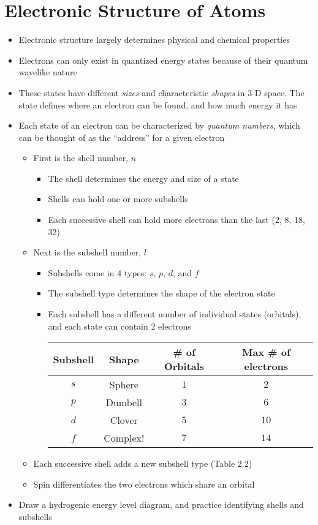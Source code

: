 \documentclass[12pt, openany, letterpaper]{memoir}
\begin{document}
\section{Electronic Structure of Atoms}
\begin{itemize}
	\item Electronic structure largely determines physical and chemical properties
	\item Electrons can only exist in quantized energy states because of their quantum wavelike nature
	\item These states have different \emph{sizes} and characteristic \emph{shapes} in 3-D space. The state defines where an electron can be found, and how much energy it has
	\item Each state of an electron can be characterized by \emph{quantum numbers}, which can be thought of as the ``address'' for a given electron
	\begin{itemize}
		\item First is the shell number, $n$
		\begin{itemize}
			\item The shell determines the energy and size of a state
			\item Shells can hold one or more subshells
			\item Each successive shell can hold more electrons than the last (2, 8, 18, 32)
		\end{itemize}
		\item  Next is the subshell number, $l$
		\begin{itemize}
			\item Subshells come in 4 types: $s$, $p$, $d$, and $f$
			\item The subshell type determines the shape of the electron state
			\item Each subshell has a different number of individual states (orbitals), and each state can contain 2 electrons
			
			\begin{tabular}{c|c|c|c}
				Subshell & Shape & \# of Orbitals & Max \# of electrons \\ \midrule
				$s$ & Sphere & $1$ & $2$ \\
				$p$ & Dumbell & $3$ & $6$ \\
				$d$ & Clover & $5$ & $10$ \\
				$f$ & Complex! & $7$ & $14$
			\end{tabular} 
		\end{itemize}
		\item Each successive shell adds a new subshell type (Table 2.2)
		\item Spin differentiates the two electrons which share an orbital			
	\end{itemize}
	\item Draw a hydrogenic energy level diagram, and practice identifying shells and subshells
\end{itemize}
\end{document}
